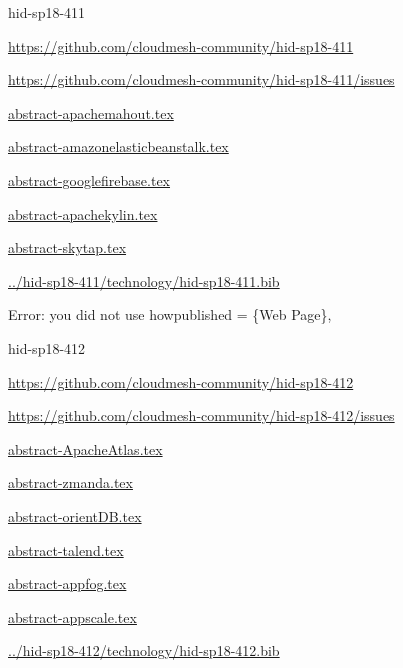 \begin{IU}

hid-sp18-411

\url{https://github.com/cloudmesh-community/hid-sp18-411}

\url{https://github.com/cloudmesh-community/hid-sp18-411/issues}

\href{https://github.com/cloudmesh-community/hid-sp18-411/blob/master//technology/abstract-apachemahout.tex}{abstract-apachemahout.tex}

\href{https://github.com/cloudmesh-community/hid-sp18-411/blob/master//technology/abstract-amazonelasticbeanstalk.tex}{abstract-amazonelasticbeanstalk.tex}

\href{https://github.com/cloudmesh-community/hid-sp18-411/blob/master//technology/abstract-googlefirebase.tex}{abstract-googlefirebase.tex}

\href{https://github.com/cloudmesh-community/hid-sp18-411/blob/master//technology/abstract-apachekylin.tex}{abstract-apachekylin.tex}

\href{https://github.com/cloudmesh-community/hid-sp18-411/blob/master//technology/abstract-skytap.tex}{abstract-skytap.tex}

\href{https://github.com/cloudmesh-community/hid-sp18-411/blob/master//technology/hid-sp18-411.bib}{../hid-sp18-411/technology/hid-sp18-411.bib}

Error: you did not use howpublished = \{Web Page\},

\end{IU}


\begin{IU}

hid-sp18-412

\url{https://github.com/cloudmesh-community/hid-sp18-412}

\url{https://github.com/cloudmesh-community/hid-sp18-412/issues}

\href{https://github.com/cloudmesh-community/hid-sp18-412/blob/master//technology/abstract-ApacheAtlas.tex}{abstract-ApacheAtlas.tex}

\href{https://github.com/cloudmesh-community/hid-sp18-412/blob/master//technology/abstract-zmanda.tex}{abstract-zmanda.tex}

\href{https://github.com/cloudmesh-community/hid-sp18-412/blob/master//technology/abstract-orientDB.tex}{abstract-orientDB.tex}

\href{https://github.com/cloudmesh-community/hid-sp18-412/blob/master//technology/abstract-talend.tex}{abstract-talend.tex}

\href{https://github.com/cloudmesh-community/hid-sp18-412/blob/master//technology/abstract-appfog.tex}{abstract-appfog.tex}

\href{https://github.com/cloudmesh-community/hid-sp18-412/blob/master//technology/abstract-appscale.tex}{abstract-appscale.tex}

\href{https://github.com/cloudmesh-community/hid-sp18-412/blob/master//technology/hid-sp18-412.bib}{../hid-sp18-412/technology/hid-sp18-412.bib}

\end{IU}


